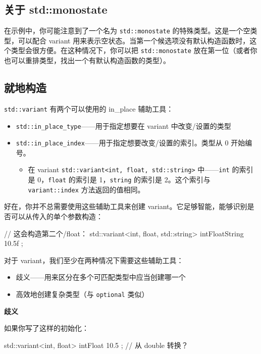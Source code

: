 \subsection{关于 std::monostate}

在示例中，你可能注意到了一个名为 \texttt{std::monostate} 的特殊类型。这是一个空类型，可以配合 variant 用来表示空状态。当第一个候选项没有默认构造函数时，这个类型会很方便。在这种情况下，你可以把 \texttt{std::monostate} 放在第一位（或者你也可以重排类型，找出一个有默认构造函数的类型）。

\subsection{就地构造}

\texttt{std::variant} 有两个可以使用的 in\_place 辅助工具：

\begin{itemize}
\item \texttt{std::in\_place\_type}——用于指定想要在 variant 中改变/设置的类型
\item \texttt{std::in\_place\_index}——用于指定想要改变/设置的索引。类型从 0 开始编号。
  \begin{itemize}
  \item 在 variant \texttt{std::variant<int, float, std::string>} 中——\texttt{int} 的索引是 0，\texttt{float} 的索引是 1，\texttt{string} 的索引是 2。这个索引与 \texttt{variant::index} 方法返回的值相同。
  \end{itemize}
\end{itemize}

好在，你并不总需要使用这些辅助工具来创建 variant。它足够智能，能够识别是否可以从传入的单个参数构造：

\begin{codebox}[cpp]
// 这会构造第二个/float：
std::variant<int, float, std::string> intFloatString { 10.5f };
\end{codebox}

对于 variant，我们至少在两种情况下需要这些辅助工具：

\begin{itemize}
\item 歧义——用来区分在多个可匹配类型中应当创建哪一个
\item 高效地创建复杂类型（与 \texttt{optional} 类似）
\end{itemize}

\textbf{歧义}

如果你写了这样的初始化：

\begin{codebox}[cpp]
std::variant<int, float> intFloat { 10.5 }; // 从 double 转换？
\end{codebox}

